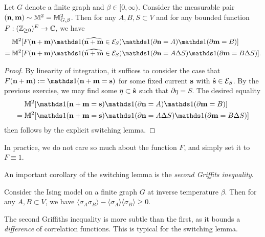 \begin{lemma}
    \label{lem:switching_lemma}
    Let $G$ denote a finite graph and $\beta\in[0,\infty)$.
    Consider the measurable pair $(\mathbf{n},\mathbf{m})\sim \mathbb M^2=\mathbb M_{G,\beta}^2$.
    Then for any $A,B,S\subset V$ and for any bounded function $F:(\mathbb Z_{\geq 0})^E\to\mathbb C$,
    we have
    \begin{align}
        &\M^2[F(\n+\m)\true{\widehat{\n+\m} \in \calE_S}\true{\partial\n=A}\true{\partial\m=B}]
        \\={}&
        \M^2[F(\n+\m)\true{\widehat{\n+\m} \in \calE_S}\true{\partial\n=A\Delta S}\true{\partial\m=B\Delta S}].
    \end{align}
\end{lemma}

\begin{proof}
    By linearity of integration, it suffices to consider the case that $F(\n+\m):=\true{\n+\m=\s}$
    for some fixed current $\mathbf{s}$ with $\hat{\mathbf{s}}\in\mathcal E_S$.
    By the previous exercise, we may find some $\eta\subset\hat{\mathbf{s}}$
    such that $\partial\eta=S$.
    The desired equality
    \begin{align}
    &
    \M^2[\true{\n+\m =\s}\true{\partial\n=A}\true{\partial\m=B}]
    \\={}&
    \M^2[\true{\n+\m =\s}\true{\partial\n=A\Delta S}\true{\partial\m=B\Delta S}]
    \end{align}
    then follows by the explicit switching lemma.
\end{proof}

In practice, we do not care so much about the function $F$, and simply set it to $F\equiv 1$.

An important corollary of the switching lemma is the \emph{second Griffits inequality}.

\begin{lemma}
    Consider the Ising model on a finite graph $G$ at inverse temperature $\beta$.
    Then for any $A,B\subset V$, we have
    $\langle\sigma_{A}\sigma_B\rangle-\langle\sigma_A\rangle\langle\sigma_B\rangle\geq 0$.
\end{lemma}

The second Griffiths inequality is more subtle than the first,
as it bounds a \emph{difference} of correlation functions.
This is typical for the switching lemma.

